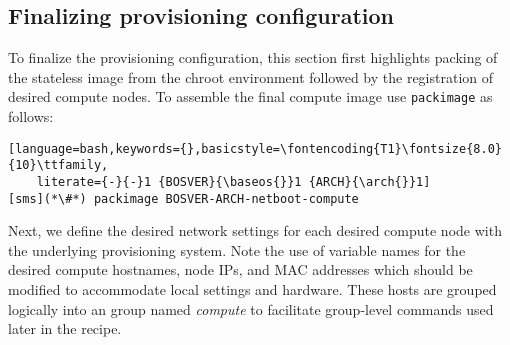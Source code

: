 \subsection{Finalizing provisioning configuration} \label{sec:assemble_bootstrap}

To finalize the \xCAT{} provisioning configuration, this section first highlights
packing of the stateless image from the chroot environment followed by the
registration of desired compute nodes. To assemble the final compute image use
\texttt{packimage} as follows:

\begin{lstlisting}[language=bash,keywords={},basicstyle=\fontencoding{T1}\fontsize{8.0}{10}\ttfamily,
    literate={-}{-}1 {BOSVER}{\baseos{}}1 {ARCH}{\arch{}}1]
[sms](*\#*) packimage BOSVER-ARCH-netboot-compute
\end{lstlisting}


\noindent Next, we define the desired network settings for each desired compute node
with the underlying provisioning system.  Note the use of variable names for
the desired compute hostnames, node IPs, and MAC addresses which should be
modified to accommodate local settings and hardware. These hosts are grouped
logically into an \xCAT{} group named {\em compute} to facilitate group-level
commands used later in the recipe.



